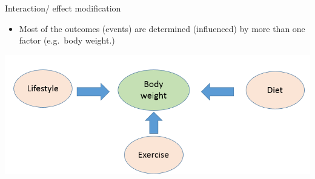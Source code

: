 \documentclass[ignorenonframetext,]{beamer}
\begin{document}
\begin{frame}{Interaction/ effect modification}

\begin{itemize}
\itemsep1pt\parskip0pt
\item
  Most of the outcomes (events) are determined (influenced) by more than
  one factor (e.g.~body weight.)
\end{itemize}

\includegraphics{lifestyle.png}

\end{frame}
\end{document}
